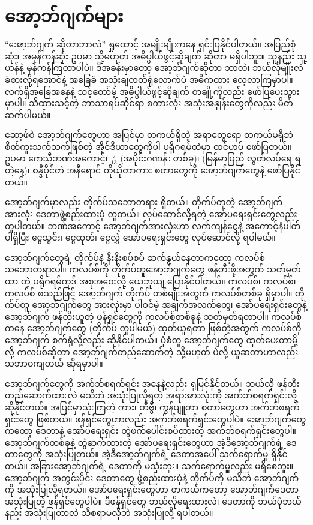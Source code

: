 \chapter{အော့ဘ်ဂျက်များ}\label{ch:ch06objs}

“အော့ဘ်ဂျက်  ဆိုတာဘာလဲ” ရှုထောင့် အမျိုးမျိုးကနေ ရှင်းပြနိုင်ပါတယ်။ အပြည့်စုံဆုံး၊ အမှန်ကန်ဆုံး ဥပမာ သို့မဟုတ် အဓိပ္ပါယ်ဖွင့်ဆိုချက် ဆိုတာ မရှိပါဘူး။ သူ့နည်း သူ့ဟန်နဲ့ မှန်ကန်ကြတာပါပဲ။ ဒီအခန်းမှာတော့ အော့ဘ်ဂျက်ဆိုတာ ဘာလဲ၊ ဘယ်လိုမျိုးလဲ ခံစားလို့ရအောင်နဲ့ အခြေခံ အသုံးချတတ်ရုံလောက်ပဲ အဓိကထား လေ့လာကြမှာပါ။  လက်ရှိအခြေအနေနဲ့ သင့်တော်မဲ့ အဓိပ္ပါယ်ဖွင့်ဆိုချက် တချို့ကိုလည်း ဖော်ပြပေးသွားမှာပါ။ သိထားသင့်တဲ့ ဘာသာရပ်ဆိုင်ရာ စကားလုံး အသုံးအနှုန်းတွေကိုလည်း မိတ်ဆက်ပါမယ်။

ဆော့ဖ်ဝဲ  အော့ဘ်ဂျက်တွေဟာ အပြင်မှာ တကယ်ရှိတဲ့ အရာတွေရော တကယ်မရှိဘဲ  စိတ်ကူးသက်\allowbreak သက်ဖြစ်တဲ့ အိုင်ဒီယာတွေကိုပါ  ပရိုဂရမ်ထဲမှာ ထင်ဟပ် ဖော်ပြတယ်။ ဥပမာ ကေသီ့ဘဏ်အကောင့်၊ $\frac{7}{13}$ (အပိုင်းဂဏန်း တစ်ခု)၊  (မြန်မာပြည် လွတ်လပ်ရေးရတဲ့နေ့)၊ စန္ဒီပိုင်တဲ့ အနီရောင် တိုယိုတာကား စတာတွေကို အော့ဘ်ဂျက်တွေနဲ့ ဖော်ပြနိုင်တယ်။


အော့ဘ်ဂျက်မှာလည်း တိုက်ပ်သဘောတရား ရှိတယ်။ တိုက်ပ်တူတဲ့ အော့ဘ်ဂျက်အားလုံး ဒေတာဖွဲ့စည်းထားပုံ တူတယ်။ လုပ်ဆောင်လို့ရတဲ့ အော်ပရေးရှင်းတွေလည်း တူပါတယ်။ ဘဏ်အကောင့် အော့ဘ်ဂျက်အားလုံးဟာ လက်ကျန်ငွေနဲ့ အကောင့်နံပါတ် ပါရှိပြီး ငွေသွင်း၊ ငွေထုတ်၊ ငွေလွှဲ အော်ပရေးရှင်းတွေ လုပ်ဆောင်လို့ ရပါမယ်။ 

အော့ဘ်ဂျက်တွေရဲ့ တိုက်ပ်နဲ့ နီးနီးစပ်စပ် ဆက်နွယ်နေတာကတော့ ကလပ်စ်  သဘောတရားပါ။ ကလပ်စ်ကို တိုက်ပ်တူအော့ဘ်ဂျက်တွေ ဖန်တီးဖို့အတွက် သတ်မှတ်ထားတဲ့ ပရိုဂရမ်ကုဒ် အစုအဝေးလို့ ယေဘုယျ ပြောနိုင်ပါတယ်။  ကလပ်စ်၊  ကလပ်စ်၊  ကလပ်စ် စသည်ဖြင့် အော့ဘ်ဂျက် တိုက်ပ် တစ်မျိုးအတွက် ကလပ်စ်တစ်ခု ရှိမှာပါ။ တိုက်ပ်တူ အော့ဘ်ဂျက်တွေ အားလုံးမှာ ပါဝင်မဲ့ အချက်အလက်တွေ၊ အော်ပရေးရှင်းတွေနဲ့ အော့ဘ်ဂျက် ဖန်တီးယူတဲ့ ဖန်ရှင်တွေကို ကလပ်စ်တစ်ခုနဲ့ သတ်မှတ်ရတာပါ။ ကလပ်စ်ကနေ  အော့ဘ်ဂျက်တွေ (တိုက်ပ် တူပါမယ်) ထုတ်ယူရတာ ဖြစ်တဲ့အတွက် ကလပ်စ်ကို အော့ဘ်ဂျက် စက်ရုံလို့လည်း ဆိုနိုင်ပါတယ်။ ပုံစံတူ အော့ဘ်ဂျက်တွေ ထုတ်ပေးတာမို့လို့ ကလပ်စ်ဆိုတာ အော့ဘ်ဂျက်တည်ဆောက်တဲ့  သို့မဟုတ်  ပဲလို့ ယူဆတာဟာလည်း သဘာဝကျတယ် ဆိုရမှာပါ။ 

အော့ဘ်ဂျက်တွေကို အက်ဘ်စရက်ရှင်း  အနေနဲ့လည်း ရှုမြင်နိုင်တယ်။ ဘယ်လို ဖန်တီး တည်ဆောက်ထားလဲ မသိဘဲ အသုံးပြုလို့ရတဲ့ အရာအားလုံးကို အက်ဘ်စရက်ရှင်းလို့ ဆိုနိုင်တယ်။ အပြင်မှာသုံးကြတဲ့ ကား၊ တီဗွီ၊ ကွန်ပျူတာ စတာတွေဟာ အက်ဘ်စရက်ရှင်းတွေ ဖြစ်တယ်။ ဖန်ရှင်တွေဟာလည်း အက်ဘ်စရက်ရှင်းတွေပါပဲ။ အော့ဘ်ဂျက်တွေကတော့ ဒေတာနဲ့ အော်ပရေးရှင်း တွဲဖက်ပေါင်းစပ်ထားတဲ့ အက်ဘ်စရက်ရှင်းတွေပါ။ အော့ဘ်ဂျက်တစ်ခုနဲ့ တွဲဆက်ထားတဲ့ အော်ပရေးရှင်းတွေဟာ အဲ့ဒီအော့ဘ်ဂျက်ရဲ့ ဒေတာတွေကို အသုံးပြုတယ်။ အဲ့ဒီအော့ဘ်ဂျက်ရဲ့ ဒေတာအပေါ် သက်ရောက်မှု ရှိနိုင်တယ်။ အခြားအော့ဘ်ဂျက်ရဲ့ ဒေတာကို မသုံးဘူး။ သက်ရောက်မှူလည်း မရှိစေဘူး။ အော့ဘ်ဂျက် အတွင်းပိုင်း ဒေတာတွေ ဖွဲ့စည်းထားပုံနဲ့ တိုက်ပ်ကို  မသိဘဲ အော့ဘ်ဂျက်ကို အသုံးပြုလို့ရတယ်။ အော်ပရေးရှင်းတွေဟာ တကယ်ကတော့ အော့ဘ်ဂျက်ဒေတာ အသုံးပြုတဲ့ ဖန်ရှင်တွေပါပဲ။ ဒီဖန်ရှင်တွေ ဘယ်လိုရေးထားလဲ၊ ဒေတာကို ဘယ်ပုံဘယ်နည်း အသုံးပြုတာလဲ သိစရာမလိုဘဲ အသုံးပြုလို့ ရပါတယ်။ 

